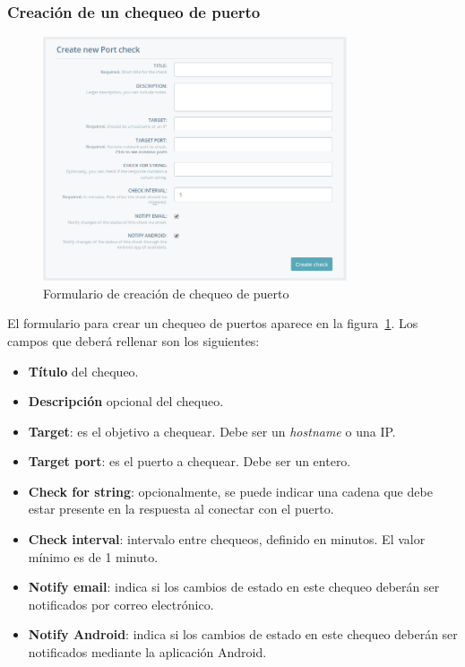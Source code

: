 \subsubsection{Creación de un chequeo de puerto}

\begin{figure}[hbtp]
  \centering
  \includegraphics[width=0.8\textwidth]{apendice_manual_usuario/pantalla_crear_port.png}
  \caption{Formulario de creación de chequeo de puerto}
  \label{fig:crear-port}
\end{figure}

El formulario para crear un chequeo de puertos aparece en la
figura~\ref{fig:crear-port}. Los campos que deberá rellenar son los siguientes:

\begin{itemize}
\item \textbf{Título} del chequeo.
\item \textbf{Descripción} opcional del chequeo.
\item \textbf{Target}: es el objetivo a chequear. Debe ser un \textit{hostname} o una IP.
\item \textbf{Target port}: es el puerto a chequear. Debe ser un entero.
\item \textbf{Check for string}: opcionalmente, se puede indicar una cadena que
  debe estar presente en la respuesta al conectar con el puerto.
\item \textbf{Check interval}: intervalo entre chequeos, definido en minutos. El
  valor mínimo es de 1 minuto.
\item \textbf{Notify email}: indica si los cambios de estado en este chequeo
  deberán ser notificados por correo electrónico.
\item \textbf{Notify Android}: indica si los cambios de estado en este chequeo
  deberán ser notificados mediante la aplicación Android.
\end{itemize}

